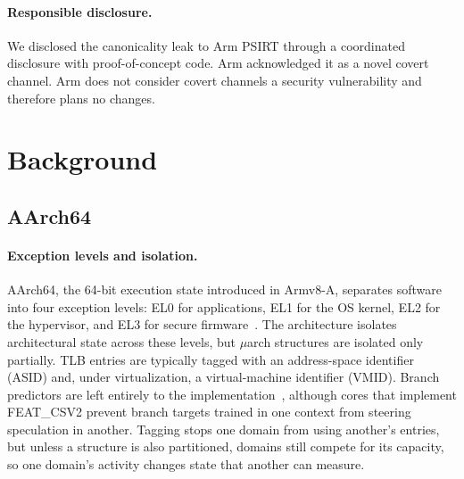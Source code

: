 \documentclass[letterpaper,twocolumn,10pt]{article}
\makeatletter
\theoremstyle{definition}
\def\uarch@bold#1#2\@nil{\if b#1\boldmath\fi}
\DeclareRobustCommand{\uarch}{{\expandafter\uarch@bold\f@series\@nil\ensuremath{\mu}}arch\xspace}
\makeatother
\begin{document}
\paragraph{Responsible disclosure.}
We disclosed the canonicality leak to Arm PSIRT through a coordinated disclosure with
proof-of-concept code. Arm acknowledged it as a novel covert channel. Arm does not consider
covert channels a security vulnerability and therefore plans no changes.

\section{Background}
\label{sec:background}

\subsection{AArch64}
\label{sec:background-aarch64}

\paragraph{Exception levels and isolation.}
AArch64, the 64-bit execution state introduced in Armv8-A, separates software into four
exception levels: EL0 for applications, EL1 for the OS kernel, EL2 for the hypervisor, and
EL3 for secure firmware~\cite{arm_exception_levels}.
The architecture isolates architectural state across these levels, but \uarch structures are
isolated only partially. TLB entries are typically tagged with an address-space identifier
(ASID) and, under virtualization, a virtual-machine identifier (VMID). Branch predictors are
left entirely to the implementation~\cite{chen2024dissectingconditionalbranchpredictors},
although cores that implement FEAT\_CSV2 prevent branch targets trained in one context from
steering speculation in another. Tagging stops one domain from using another's entries, but
unless a structure is also partitioned, domains still compete for its capacity, so one
domain's activity changes state that another can measure.
\end{document}
